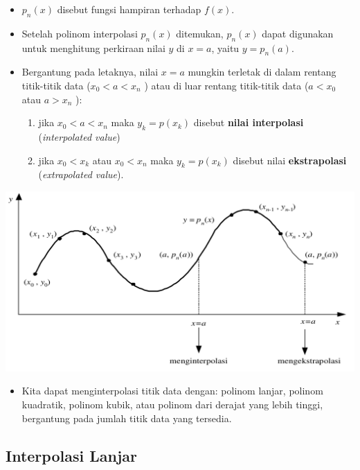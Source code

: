 \documentclass[pdflatex,compress,mathserif]{beamer}
\begin{document}
\begin{frame}
	\begin{itemize}
		\item $ p_n(x) $ disebut fungsi hampiran terhadap $ f(x) $.
		\item Setelah polinom interpolasi $ p_n(x) $ ditemukan, $ p_n(x) $ dapat digunakan untuk menghitung perkiraan nilai $ y $ di $ x = a $, yaitu $ y = p_n(a) $.
		\item Bergantung pada letaknya, nilai $ x = a $ mungkin terletak di dalam rentang titik-titik data ($ x_0 < a < x_n $ ) atau di luar rentang titik-titik data ($ a < x_0 $ atau $ a > x_n $ ):
		\begin{enumerate}
			\item jika $ x_0 < a < x_n $ maka $ y_k = p(x_k) $ disebut \textbf{nilai interpolasi} (\textit{interpolated value})
			\item jika $ x_0 < x_k $ atau $ x_0 < x_n $ maka $ y_k = p(x_k) $ disebut nilai \textbf{ekstrapolasi} (\textit{extrapolated value}).
		\end{enumerate}
	\end{itemize}
\end{frame}

\begin{frame}
	\begin{center}
		\includegraphics[width=0.7\linewidth]{img/img03}
	\end{center}
	\begin{itemize}
		\item Kita dapat menginterpolasi titik data dengan: polinom lanjar, polinom kuadratik, polinom kubik, atau polinom dari derajat yang lebih tinggi, bergantung pada jumlah titik data yang tersedia.
	\end{itemize}
\end{frame}

\subsection{Interpolasi Lanjar}
\end{document}
